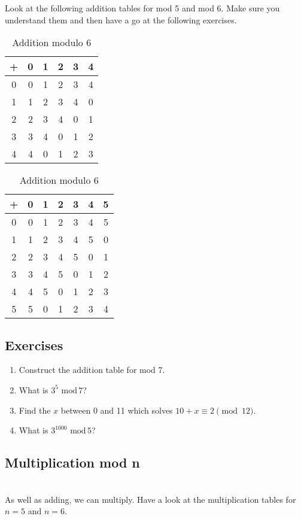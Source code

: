 \documentclass[12pt]{amsart}
\theoremstyle{definition}
\theoremstyle{definition}
\theoremstyle{remark}
\renewcommand{\mod}{\text{ mod}\,}
\begin{document}
Look at the following addition tables for mod 5 and mod 6. Make sure you understand them and then have a go at the following exercises.
\begin{table}[!htb]
    \caption*{}
    \begin{minipage}{.5\linewidth}
      \caption*{Addition modulo $5$}
      \centering
\begin{tabular}{c||c|c|c|c|c}
+&0&1&2&3&4\\
\hline\hline
0&0&1&2&3&4\\
\hline
1&1&2&3&4&0\\
\hline
2&2&3&4&0&1\\
\hline
3&3&4&0&1&2\\
\hline
4&4&0&1&2&3
\end{tabular}
    \end{minipage}%
    \begin{minipage}{.5\linewidth}
      \centering
        \caption*{Addition modulo $6$}
\begin{tabular}{c||c|c|c|c|c|c}
+&0&1&2&3&4&5\\
\hline\hline
0&0&1&2&3&4&5\\
\hline
1&1&2&3&4&5&0\\
\hline
2&2&3&4&5&0&1\\
\hline
3&3&4&5&0&1&2\\
\hline
4&4&5&0&1&2&3\\
\hline
5&5&0&1&2&3&4
\end{tabular}
    \end{minipage} 
\end{table}
\subsection*{Exercises}
\begin{enumerate}
\item Construct the addition table for mod 7.
\item What is $3^5 \mod 7$?
\item Find the $x$ between 0 and 11 which solves $10+x\equiv 2\pmod{12}$.
\item What is $3^{1000} \mod 5$?
\end{enumerate}

\subsection*{Multiplication mod n}
\hfill \\
As well as adding, we can multiply. Have a look at the multiplication tables for $n=5$ and $n=6$.\\
\end{document}
